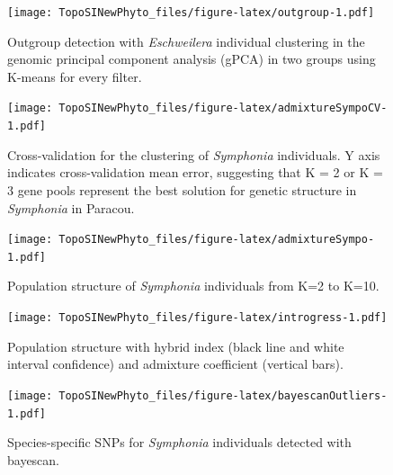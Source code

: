 \documentclass[12pt,]{article}
\begin{document}
\newpage

\begin{figure}
\centering
\texttt{[image: TopoSINewPhyto\_files/figure-latex/outgroup-1.pdf]}
\caption{\label{fig:outgroup}Outgroup detection with \emph{Eschweilera} individual clustering in the genomic principal component analysis (gPCA) in two groups using K-means for every filter.}
\end{figure}

\newpage

\begin{figure}
\centering
\texttt{[image: TopoSINewPhyto\_files/figure-latex/admixtureSympoCV-1.pdf]}
\caption{\label{fig:admixtureSympoCV}Cross-validation for the clustering of \emph{Symphonia} individuals. Y axis indicates cross-validation mean error, suggesting that K = 2 or K = 3 gene pools represent the best solution for genetic structure in \emph{Symphonia} in Paracou.}
\end{figure}

\newpage

\begin{figure}
\centering
\texttt{[image: TopoSINewPhyto\_files/figure-latex/admixtureSympo-1.pdf]}
\caption{\label{fig:admixtureSympo}Population structure of \emph{Symphonia} individuals from K=2 to K=10.}
\end{figure}

\newpage

\begin{figure}
\centering
\texttt{[image: TopoSINewPhyto\_files/figure-latex/introgress-1.pdf]}
\caption{\label{fig:introgress}Population structure with hybrid index (black line and white interval confidence) and admixture coefficient (vertical bars).}
\end{figure}

\newpage

\begin{figure}
\centering
\texttt{[image: TopoSINewPhyto\_files/figure-latex/bayescanOutliers-1.pdf]}
\caption{\label{fig:bayescanOutliers}Species-specific SNPs for \emph{Symphonia} individuals detected with bayescan.}
\end{figure}
\end{document}
